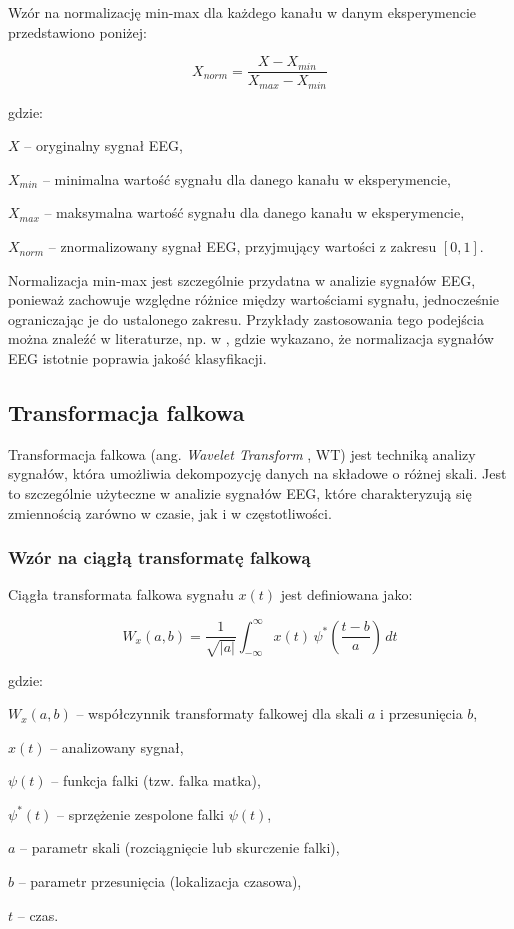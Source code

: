\documentclass[eeg_v4.tex]{subfiles}
\begin{document}
    Wzór na normalizację min-max dla każdego kanału w danym eksperymencie przedstawiono poniżej:

    \[
        X_{norm} = \frac{X - X_{min}}{X_{max} - X_{min}}
    \]

    gdzie:
    \begin{description}
        \item \(X\) – oryginalny sygnał EEG,
        \item \(X_{min}\) – minimalna wartość sygnału dla danego kanału w eksperymencie,
        \item \(X_{max}\) – maksymalna wartość sygnału dla danego kanału w eksperymencie,
        \item \(X_{norm}\) – znormalizowany sygnał EEG, przyjmujący wartości z zakresu \([0, 1]\).
    \end{description}

    Normalizacja min-max jest szczególnie przydatna w analizie sygnałów EEG, ponieważ zachowuje względne różnice między
    wartościami sygnału, jednocześnie ograniczając je do ustalonego zakresu. Przykłady zastosowania tego podejścia można
    znaleźć w literaturze, np. w \cite{roots2020}
    , gdzie wykazano, że normalizacja sygnałów EEG istotnie poprawia jakość klasyfikacji.


    \subsection{Transformacja falkowa}

    Transformacja falkowa (ang. \textit{Wavelet Transform}
    , WT) jest techniką analizy sygnałów, która umożliwia dekompozycję danych na składowe o różnej skali. Jest to
    szczególnie użyteczne w analizie sygnałów EEG, które charakteryzują się zmiennością zarówno w czasie, jak i w
    częstotliwości.

    \subsubsection{Wzór na ciągłą transformatę falkową}

    Ciągła transformata falkowa sygnału \( x(t) \) jest definiowana jako:

    \[
        W_x(a, b) = \frac{1}{\sqrt{|a|}} \int_{-\infty}^{\infty} x(t) \, \psi^*\left(\frac{t - b}{a}\right) \, dt
    \]

    gdzie:
    \begin{description}
        \item \( W_x(a, b) \) – współczynnik transformaty falkowej dla skali \( a \) i przesunięcia \( b \),
        \item \( x(t) \) – analizowany sygnał,
        \item \( \psi(t) \) – funkcja falki (tzw. falka matka),
        \item \( \psi^*(t) \) – sprzężenie zespolone falki \( \psi(t) \),
        \item \( a \) – parametr skali (rozciągnięcie lub skurczenie falki),
        \item \( b \) – parametr przesunięcia (lokalizacja czasowa),
        \item \( t \) – czas.
    \end{description}
\end{document}
